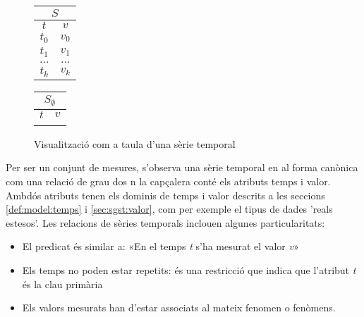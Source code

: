 \begin{figure}[tp]
  \centering
  \begin{tabular}[c]{|c|c|}
    \multicolumn{2}{c}{$S$} \\ \hline
    $t$  & $v$ \\ \hline
    $t_0$  & $v_0$ \\
    $t_1$  & $v_1$ \\
    $\dots$  & $\dots$ \\ 
    $t_k$  & $v_k$ \\ \hline
  \end{tabular} \qquad
  \begin{tabular}[c]{|c|c|}
    \multicolumn{2}{c}{$S_{\emptyset}$} \\ \hline
    $t$  & $v$ \\ \hline
      &  \\ \hline
  \end{tabular}
  \caption{Visualització com a taula d'una sèrie temporal}
  \label{fig:model:serietemporal:taula}
\end{figure}


Per ser un conjunt de mesures, s'observa una sèrie temporal en al
forma canònica com una relació de grau dos n la capçalera conté els
atributs temps i valor. Ambdós atributs tenen els dominis de temps i
valor descrits a les seccions \ref{def:model:temps} i
\ref{sec:sgst:valor}, com per exemple el tipus de dades 'reals
estesos'. Les relacions de sèries temporals inclouen algunes
particularitats:

\begin{itemize}
\item El predicat és similar a: «En el temps \emph{t} s'ha mesurat el
  valor \emph{v}»
\item Els temps no poden estar repetits: és una restricció que indica
  que l'atribut \emph{t} és la clau primària
\item Els valors mesurats han d'estar associats al mateix fenomen o
  fenòmens.
\end{itemize}










